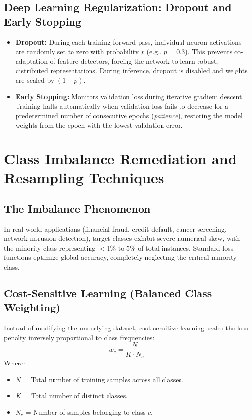 \subsection{Deep Learning Regularization: Dropout and Early Stopping}
\begin{itemize}
    \item \textbf{Dropout:} During each training forward pass, individual neuron activations are randomly set to zero with probability $p$ (e.g., $p = 0.3$). This prevents co-adaptation of feature detectors, forcing the network to learn robust, distributed representations. During inference, dropout is disabled and weights are scaled by $(1 - p)$.
    \item \textbf{Early Stopping:} Monitors validation loss during iterative gradient descent. Training halts automatically when validation loss fails to decrease for a predetermined number of consecutive epochs (\textit{patience}), restoring the model weights from the epoch with the lowest validation error.
\end{itemize}


\section{Class Imbalance Remediation and Resampling Techniques}
\label{sec:class_imbalance}

\subsection{The Imbalance Phenomenon}
In real-world applications (financial fraud, credit default, cancer screening, network intrusion detection), target classes exhibit severe numerical skew, with the minority class representing $<1\%\text{ to }5\%$ of total instances. Standard loss functions optimize global accuracy, completely neglecting the critical minority class.

\subsection{Cost-Sensitive Learning (Balanced Class Weighting)}
Instead of modifying the underlying dataset, cost-sensitive learning scales the loss penalty inversely proportional to class frequencies:
\begin{equation}
\label{eq:class_weight_formula}
w_c = \frac{N}{K \cdot N_c}
\end{equation}
Where:
\begin{itemize}
    \item $N$ = Total number of training samples across all classes.
    \item $K$ = Total number of distinct classes.
    \item $N_c$ = Number of samples belonging to class $c$.
\end{itemize}

